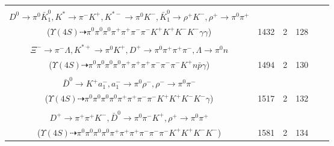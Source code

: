 \documentclass[landscape]{article}
\newcounter{rownumbers}
\newcommand\rn{\stepcounter{rownumbers}\arabic{rownumbers}}
\newcommand{\EOLP}{\\ \hline} %
\newcommand{\topoTags}[1]{#1} %
\begin{document}
\begin{longtable}{clcccc}
\rn & \makecell[l]{ $ 
\Upsilon(4S) \rightarrow B^{0} \bar{B}^{0} ,
B^{0} \rightarrow X_{sd} \gamma ,
\bar{B}^{0} \rightarrow D^{*+} D_{s}^{-} \gamma ,
X_{sd} \rightarrow \pi^{-} K^{+} ,
D^{*+} \rightarrow \pi^{+} D^{0} ,
D_{s}^{-} \rightarrow K^{*} K^{*-} ,
$ \\ $
D^{0} \rightarrow \pi^{0} \bar{K}_1^{0} ,
K^{*} \rightarrow \pi^{-} K^{+} ,
K^{*-} \rightarrow \pi^{0} K^{-} ,
\bar{K}_1^{0} \rightarrow \rho^{+} K^{-} ,
\rho^{+} \rightarrow \pi^{0} \pi^{+} 
$ \\ ($
\Upsilon(4S) \dashrightarrow \pi^{0} \pi^{0} \pi^{0} \pi^{+} \pi^{+} \pi^{-} \pi^{-} K^{+} K^{+} K^{-} K^{-} \gamma \gamma 
$) } & \topoTags{1432 & }2 & 128 \EOLP

\rn & \makecell[l]{ $ 
\Upsilon(4S) \rightarrow B^{0} \bar{B}^{0} ,
B^{0} \rightarrow \pi^{-} K_1^{+} ,
\bar{B}^{0} \rightarrow D^{*+} \bar{\Lambda} \Xi^{-} ,
K_1^{+} \rightarrow \pi^{0} K^{*+} ,
D^{*+} \rightarrow D^{+} \gamma ,
\bar{\Lambda} \rightarrow \pi^{+} \bar{p} ,
$ \\ $
\Xi^{-} \rightarrow \pi^{-} \Lambda ,
K^{*+} \rightarrow \pi^{0} K^{+} ,
D^{+} \rightarrow \pi^{0} \pi^{+} \pi^{+} \pi^{-} ,
\Lambda \rightarrow \pi^{0} n 
$ \\ ($
\Upsilon(4S) \dashrightarrow \pi^{0} \pi^{0} \pi^{0} \pi^{0} \pi^{+} \pi^{+} \pi^{+} \pi^{-} \pi^{-} \pi^{-} K^{+} n \bar{p} \gamma 
$) } & \topoTags{1494 & }2 & 130 \EOLP

\rn & \makecell[l]{ $ 
\Upsilon(4S) \rightarrow B^{0} \bar{B}^{0} ,
B^{0} \rightarrow \pi^{-} K^{+} D^{0} \bar{D}^{*0} ,
\bar{B}^{0} \rightarrow \pi^{0} D^{0} ,
D^{0} \rightarrow \pi^{+} K^{-} ,
\bar{D}^{*0} \rightarrow \bar{D}^{0} \gamma ,
D^{0} \rightarrow \pi^{0} \pi^{+} K^{-} ,
$ \\ $
\bar{D}^{0} \rightarrow K^{+} a_{1}^{-} ,
a_{1}^{-} \rightarrow \pi^{0} \rho^{-} ,
\rho^{-} \rightarrow \pi^{0} \pi^{-} 
$ \\ ($
\Upsilon(4S) \dashrightarrow \pi^{0} \pi^{0} \pi^{0} \pi^{0} \pi^{+} \pi^{+} \pi^{-} \pi^{-} K^{+} K^{+} K^{-} K^{-} \gamma 
$) } & \topoTags{1517 & }2 & 132 \EOLP

\rn & \makecell[l]{ $ 
\Upsilon(4S) \rightarrow B^{0} \bar{B}^{0} ,
B^{0} \rightarrow D^{-} a_{1}^{+} ,
\bar{B}^{0} \rightarrow K^{*-} D^{+} \bar{D}^{0} ,
D^{-} \rightarrow \pi^{-} \pi^{-} K^{+} ,
a_{1}^{+} \rightarrow \pi^{0} \rho^{+} ,
K^{*-} \rightarrow \pi^{0} K^{-} ,
$ \\ $
D^{+} \rightarrow \pi^{+} \pi^{+} K^{-} ,
\bar{D}^{0} \rightarrow \pi^{0} \pi^{-} K^{+} ,
\rho^{+} \rightarrow \pi^{0} \pi^{+} 
$ \\ ($
\Upsilon(4S) \dashrightarrow \pi^{0} \pi^{0} \pi^{0} \pi^{0} \pi^{+} \pi^{+} \pi^{+} \pi^{-} \pi^{-} \pi^{-} K^{+} K^{+} K^{-} K^{-} 
$) } & \topoTags{1581 & }2 & 134 \EOLP


\end{longtable}
\end{document}
